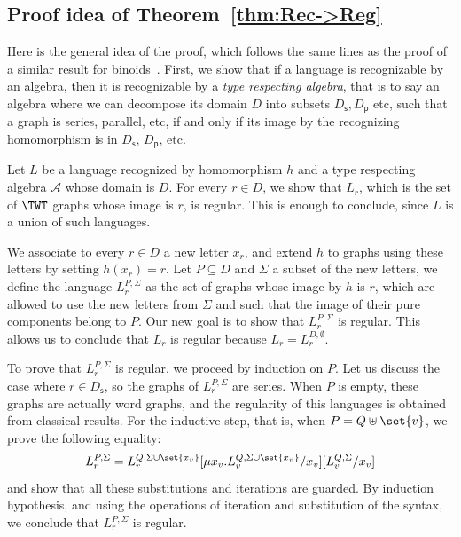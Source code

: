 \subsection{Proof idea of Theorem~\ref{thm:Rec->Reg}}
Here is the general idea of the proof, which follows the same lines as the proof of a similar result for binoids~\cite{Gazdag}. First, we show that if a language is recognizable by an algebra, then it is recognizable by a \emph{type respecting algebra}, that is to say an algebra where we can decompose its domain $D$ into subsets  $D_\mathsf{s}, D_\mathsf{p}$ etc, such that a graph is series,  parallel, etc, if and only if its image by the recognizing homomorphism is in $D_\mathsf{s}$, $D_\mathsf{p}$, etc. 

Let $L$ be a language recognized by homomorphism $h$ and a type respecting algebra $\mathcal{A}$ whose domain is $D$.  For every  $r\in D$,  we show that $L_r$, which is the set of $\TWT$ graphs whose image is $r$, is regular. This is enough to conclude, since $L$ is a union of such languages. 

We associate to every $r\in D$ a new letter $x_r$, and extend $h$ to graphs using these letters by setting $h(x_r)=r$. Let $P\subseteq D$  and $\Sigma$ a subset of the new letters,  we define the language $L^{P,\Sigma}_r$ as the set of graphs whose image by $h$ is $r$, which are allowed to use the new letters from $\Sigma$ and such that the image of their pure components belong to $P$. Our new goal is to show that $L^{P,\Sigma}_r$ is regular. This allows us to conclude that $L_r$ is regular because $L_r=L^{D,\emptyset}_r$.    

To prove that $L^{P,\Sigma}_r$ is regular, we proceed by induction on $P$. Let us discuss the case where $r\in D_\mathsf{s}$, so the graphs of $L^{P,\Sigma}_r$ are series.  When $P$ is empty, these graphs are actually word graphs, and the regularity of this languages is obtained from classical results. For the inductive step, that is, when $P=Q\uplus \set{v}$, we prove the following equality:
$$L^{P,\Sigma}_r=L^{Q,\Sigma\cup\set{x_v}}_r[\mu x_v. L^{Q,\Sigma\cup\set{x_v}}_v/x_v][L^{Q,\Sigma}_v/x_v]  $$
and show that all these substitutions and iterations are guarded. By induction hypothesis, and using the operations of iteration and substitution of the syntax, we conclude that $L^{P,\Sigma}_r$ is regular. 

